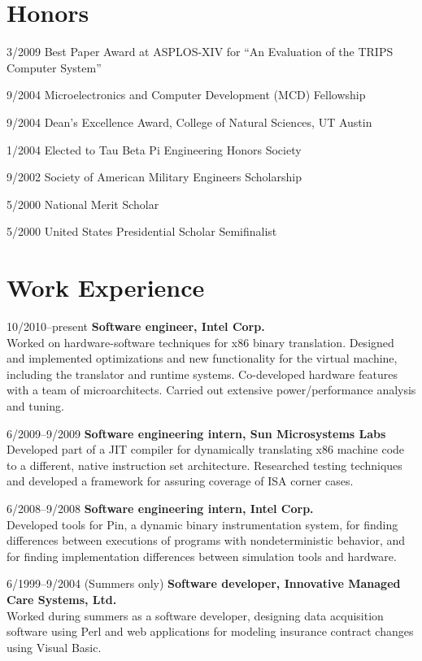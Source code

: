 \documentclass[11pt]{article}
\begin{document}
\section{Honors}
\begin{list}{}
    {\renewcommand{\makelabel}{\entrylabel}
    \setlength{\labelwidth}{84pt}
    \setlength{\leftmargin}{90pt}
    \setlength{\itemsep}{1pt}
    \setlength{\parskip}{0pt}
    \setlength{\parsep}{0pt}
  }

\item[3/2009] Best Paper Award at ASPLOS-XIV for ``An Evaluation of the TRIPS Computer System''
\item[9/2004] Microelectronics and Computer Development (MCD) Fellowship
\item[9/2004] Dean's Excellence Award, College of Natural Sciences, UT Austin
\item[1/2004] Elected to Tau Beta Pi Engineering Honors Society
\item[9/2002] Society of American Military Engineers Scholarship
\item[5/2000] National Merit Scholar
\item[5/2000] United States Presidential Scholar Semifinalist

\end{list}

\section{Work Experience}
\begin{CV}
\item[10/2010--present] \textbf{Software engineer, Intel Corp.} \\
Worked on hardware-software techniques for x86 binary translation.
Designed and implemented optimizations and new functionality for the
virtual machine, including the translator and runtime systems.
Co-developed hardware features with a team of microarchitects.
Carried out extensive power/performance analysis and tuning.

\item[6/2009--9/2009] \textbf{Software engineering intern, Sun Microsystems Labs} \\
Developed part of a JIT compiler for dynamically translating x86 machine code to a different, native instruction set architecture.  Researched testing techniques and developed a framework for assuring coverage of ISA corner cases.
\item[6/2008--9/2008] \textbf{Software engineering intern, Intel Corp.} \\
Developed tools for Pin, a dynamic binary instrumentation system, for finding differences between executions of programs with nondeterministic behavior, and for finding implementation differences between simulation tools and hardware.
\item[6/1999--9/2004 (Summers only)] \textbf{Software developer, Innovative Managed Care Systems, Ltd.} \\
Worked during summers as a software developer, designing data acquisition software using Perl and web applications for modeling insurance contract changes using Visual Basic.
\end{CV}
\end{document}
